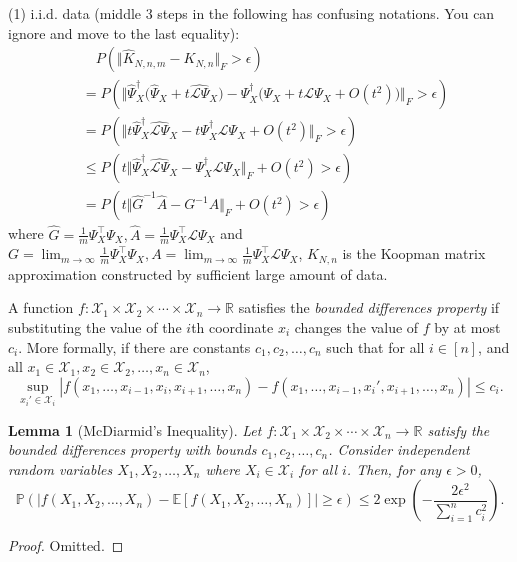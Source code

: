 \documentclass{article}[11]
\newtheorem{lemma}[theorem]{Lemma}
\begin{document}
	(1) i.i.d. data (middle 3 steps in the following has confusing notations. You can ignore and move to the last equality):
	\begin{align*}
		&\quad P\left(\Vert \widehat{K}_{N,n,m} - K_{N,n} \Vert_F > \epsilon \right) \\
		&= P\left(\Vert \widehat{\Psi}_X^{\dagger}\big(\widehat{\Psi}_X + t \widehat{\mathcal{L}\Psi}_X \big) - \Psi_X^{\dagger}\big(\Psi_X + t\mathcal{L}\Psi_{X} + O(t^2) \big) \Vert_F > \epsilon \right) \\
		&= P\left(\Vert t\widehat{\Psi}_X^{\dagger} \widehat{\mathcal{L}\Psi}_X - t\Psi_X^{\dagger}\mathcal{L}\Psi_{X} + O(t^2) \Vert_F > \epsilon \right) \\
		&\leq P\left( t\Vert \widehat{\Psi}_X^{\dagger} \widehat{\mathcal{L}\Psi}_X - \Psi_X^{\dagger}\mathcal{L}\Psi_{X} \Vert_F + O(t^2) > \epsilon \right) \\
		&= P\left( t\Vert \widehat{G}^{-1} \widehat{A} - G^{-1}A \Vert_F + O(t^2) > \epsilon \right)
	\end{align*}
	where $\widehat{G} = \frac{1}{m}\Psi_X^\top \Psi_X, \widehat{A} = \frac{1}{m}\Psi_X^\top \mathcal{L}\Psi_{X}$ and $G = \lim_{m\to\infty}\frac{1}{m}\Psi_X^\top \Psi_X, A = \lim_{m\to\infty}\frac{1}{m}\Psi_X^\top \mathcal{L}\Psi_{X}$, $K_{N,n}$ is the Koopman matrix approximation constructed by sufficient large amount of data.
	
	
	A function $f : \mathcal{X}_1 \times \mathcal{X}_2 \times \cdots \times \mathcal{X}_n \to \mathbb{R}$ satisfies the \textit{bounded differences property} if substituting the value of the $i$th coordinate $x_i$ changes the value of $f$ by at most $c_i$. More formally, if there are constants $c_1, c_2, \ldots, c_n$ such that for all $i \in [n]$, and all $x_1 \in \mathcal{X}_1, x_2 \in \mathcal{X}_2, \ldots, x_n \in \mathcal{X}_n$,
	\[
	\sup_{x_i' \in \mathcal{X}_i} |f(x_1, \ldots, x_{i-1}, x_i, x_{i+1}, \ldots, x_n) - f(x_1, \ldots, x_{i-1}, x_i', x_{i+1}, \ldots, x_n)| \leq c_i.
	\]
	
	
	\begin{lemma}[McDiarmid's Inequality]\label{McDiarmid}
		Let $f : \mathcal{X}_1 \times \mathcal{X}_2 \times \cdots \times \mathcal{X}_n \to \mathbb{R}$ satisfy the bounded differences property with bounds $c_1, c_2, \ldots, c_n$. Consider independent random variables $X_1, X_2, \ldots, X_n$ where $X_i \in \mathcal{X}_i$ for all $i$. Then, for any $\epsilon > 0$,
		\[
		\mathbb{P}(|f(X_1, X_2, \ldots, X_n) - \mathbb{E}[f(X_1, X_2, \ldots, X_n)]| \geq \epsilon) \leq 2 \exp\left( - \frac{2\epsilon^2}{\sum_{i=1}^n c_i^2} \right).
		\]
	\end{lemma}
	\begin{proof}
		Omitted.
	\end{proof}
	
\end{document}
